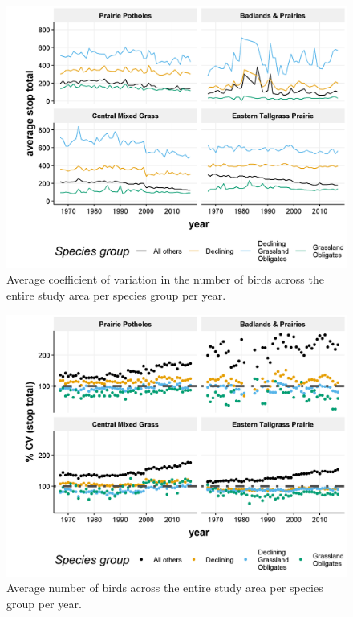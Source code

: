 \documentclass[print]{nuthesis}
\begin{document}
\begin{figure}
\includegraphics[width=0.85\linewidth]{.//chapterFiles/discontinuityAnalysis/figsCalledInDiss/stopTotal-byBCR-mean} \caption{Average coefficient of variation in the number of birds across the entire study area per species group per year.}\label{fig:stopTotalMean}
\end{figure}
\begin{figure}
\includegraphics[width=0.85\linewidth]{.//chapterFiles/discontinuityAnalysis/figsCalledInDiss/stopTotal-byBCR-CV} \caption{Average number of birds across the entire study area per species group per year. }\label{fig:stopTotalCV}
\end{figure}
\end{document}
